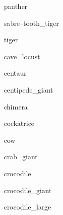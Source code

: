 \documentclass[letterpaper,serif]{module}
\begin{document}
\begin{newmonster}{panther}\end{newmonster}

\begin{newmonster}{sabre--tooth_tiger}\end{newmonster}

\begin{newmonster}{tiger}\end{newmonster}

\begin{newmonster}{cave_locust}\end{newmonster}

\begin{newmonster}{centaur}\end{newmonster}

\begin{newmonster}{centipede_giant}\end{newmonster}

\begin{newmonster}{chimera}\end{newmonster}

\begin{newmonster}{cockatrice}\end{newmonster}

\begin{newmonster}{cow}\end{newmonster}

\begin{newmonster}{crab_giant}\end{newmonster}

\begin{newmonster}{crocodile}\end{newmonster}

\begin{newmonster}{crocodile_giant}\end{newmonster}

\begin{newmonster}{crocodile_large}\end{newmonster}
\end{document}
